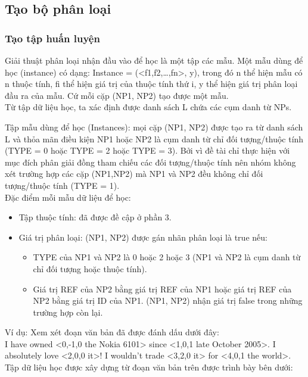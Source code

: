 \documentclass[12pt]{extarticle}
\begin{document}
		\subsection{Tạo bộ phân loại}
			\subsubsection*{Tạo tập huấn luyện}
				\par Giải thuật phân loại nhận đầu vào để học là một tập các mẫu. Một mẫu dùng để học (instance) có dạng: Instance = (<f1,f2,…,fn>, y), trong đó n thể hiện mẫu có n thuộc tính, fi thể hiện giá trị của thuộc tính thứ i, y thể hiện giá trị phân loại đầu ra của mẫu. Cứ mỗi cặp (NP1, NP2) tạo được một mẫu. 
				\\Từ tập dữ liệu học, ta xác định được danh sách L chứa các cụm danh từ NPs.
				\par Tập mẫu dùng để học (Instances): mọi cặp (NP1, NP2) được tạo ra từ danh sách L và thỏa mãn điều kiện NP1 hoặc NP2 là cụm danh từ chỉ đối tượng/thuộc tính (TYPE = 0 hoặc TYPE = 2 hoặc TYPE = 3). Bởi vì đề tài chỉ thực hiện với mục đích phân giải đồng tham chiếu các đối tượng/thuộc tính nên nhóm không xét trường hợp các cặp (NP1,NP2) mà NP1 và NP2 đều không chỉ đối tượng/thuộc tính (TYPE = 1).
				\\Đặc điểm mỗi mẫu dữ liệu để học:
				\begin{itemize}
					\item{Tập thuộc tính: đã được đề cập ở phần 3.}
					\item{Giá trị phân loại: (NP1, NP2) được gán nhãn phân loại là true nếu:
						\begin{itemize}
							\item{TYPE của NP1 và NP2 là 0 hoặc 2 hoặc 3 (NP1 và NP2 là cụm danh từ chỉ đối tượng hoặc thuộc tính).}
							\item{Giá trị REF của NP2 bằng giá trị REF của NP1 hoặc giá trị REF của NP2 bằng giá trị ID của NP1. (NP1, NP2) nhận giá trị false trong những trường hợp còn lại.}
						\end{itemize}}
				\end{itemize}
				\par Ví dụ: Xem xét đoạn văn bản đã được đánh dấu dưới đây:
				\\I have owned <0,-1,0 the Nokia 6101> since <1,0,1 late October 2005>. I absolutely love <2,0,0 it>! I wouldn't trade <3,2,0 it> for <4,0,1 the world>.
				\\Tập dữ liệu học được xây dựng từ đoạn văn bản trên được trình bày bên dưới:
\end{document}
